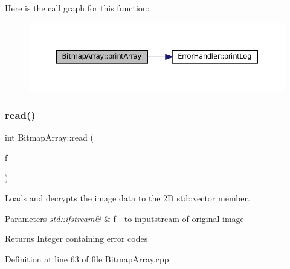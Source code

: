 Here is the call graph for this function\+:
\nopagebreak
\begin{figure}[H]
\begin{center}
\leavevmode
\includegraphics[width=350pt]{classBitmapArray_a99a8a164e51e29407f24dab4752232c1_cgraph}
\end{center}
\end{figure}
\mbox{\label{classBitmapArray_a3a5834d03cd095769b422d4d66b9435f}} 
\subsubsection{\texorpdfstring{read()}{read()}}
{\footnotesize\ttfamily int Bitmap\+Array\+::read (\begin{DoxyParamCaption}\item[{std\+::ifstream \&}]{f }\end{DoxyParamCaption})\hspace{0.3cm}{\ttfamily [private]}}



Loads and decrypts the image data to the 2D std\+::vector member. 


\begin{DoxyParams}{Parameters}
{\em std\+::ifstream\&} & f -\/ to inputstream of original image \\
\hline
\end{DoxyParams}
\begin{DoxyReturn}{Returns}
Integer containing error codes 
\end{DoxyReturn}


Definition at line 63 of file Bitmap\+Array.\+cpp.

